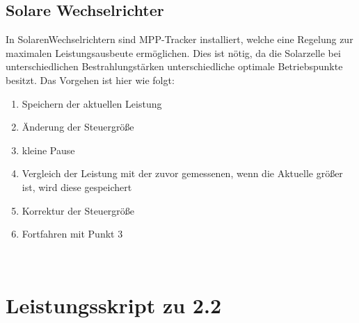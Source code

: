 \documentclass[a4paper,12pt]{article}
\begin{document}
\newline \newline

\subsection{Solare Wechselrichter}
In SolarenWechselrichtern sind MPP-Tracker installiert, welche eine Regelung zur maximalen Leistungsausbeute ermöglichen. Dies ist nötig, da die Solarzelle bei unterschiedlichen Bestrahlungstärken unterschiedliche optimale Betriebspunkte besitzt.
Das Vorgehen ist hier wie folgt:
\begin{enumerate}
 \item Speichern der aktuellen Leistung
 \item Änderung der Steuergröße
 \item kleine Pause
 \item Vergleich der Leistung mit der zuvor gemessenen, wenn die Aktuelle größer ist, wird diese gespeichert
 \item Korrektur der Steuergröße
 \item Fortfahren mit Punkt 3
\end{enumerate}
~\cite{MPPT}




\appendix
\section{Leistungsskript zu 2.2}

\end{document}
